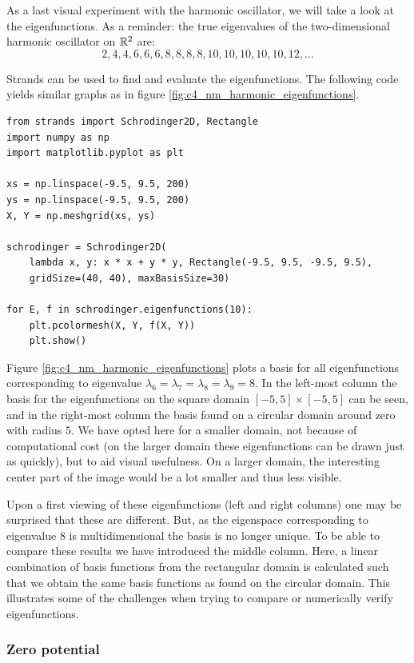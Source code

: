As a last visual experiment with the harmonic oscillator, we will take a look at the eigenfunctions. As a reminder: the true eigenvalues of the two-dimensional harmonic oscillator on $\mathbb{R}^2$ are:
$$
    2, 4, 4, 6, 6, 6, 8, 8, 8, 8, 10, 10, 10, 10, 10, 12, \dots
$$

Strands can be used to find and evaluate the eigenfunctions. The following code yields similar graphs as in figure \ref{fig:c4_nm_harmonic_eigenfunctions}.
\begin{verbatim}
from strands import Schrodinger2D, Rectangle
import numpy as np
import matplotlib.pyplot as plt

xs = np.linspace(-9.5, 9.5, 200)
ys = np.linspace(-9.5, 9.5, 200)
X, Y = np.meshgrid(xs, ys)

schrodinger = Schrodinger2D(
    lambda x, y: x * x + y * y, Rectangle(-9.5, 9.5, -9.5, 9.5),
    gridSize=(40, 40), maxBasisSize=30)

for E, f in schrodinger.eigenfunctions(10):
    plt.pcolormesh(X, Y, f(X, Y))
    plt.show()
\end{verbatim}

Figure \ref{fig:c4_nm_harmonic_eigenfunctions} plots a basis for all eigenfunctions corresponding to eigenvalue $\lambda_6 = \lambda_7 = \lambda_8 = \lambda_9 = 8$. In the left-most column the basis for the eigenfunctions on the square domain $[-5, 5] \times [-5, 5]$ can be seen, and in the right-most column the basis found on a circular domain around zero with radius $5$. We have opted here for a smaller domain, not because of computational cost (on the larger domain these eigenfunctions can be drawn just as quickly), but to aid visual usefulness. On a larger domain, the interesting center part of the image would be a lot smaller and thus less visible.

Upon a first viewing of these eigenfunctions (left and right columns) one may be surprised that these are different. But, as the eigenspace corresponding to eigenvalue $8$ is multidimensional the basis is no longer unique. To be able to compare these results we have introduced the middle column. Here, a linear combination of basis functions from the rectangular domain is calculated such that we obtain the same basis functions as found on the circular domain. This illustrates some of the challenges when trying to compare or numerically verify eigenfunctions.

\subsubsection{Zero potential}\label{sec:c4_numerical_zero}

